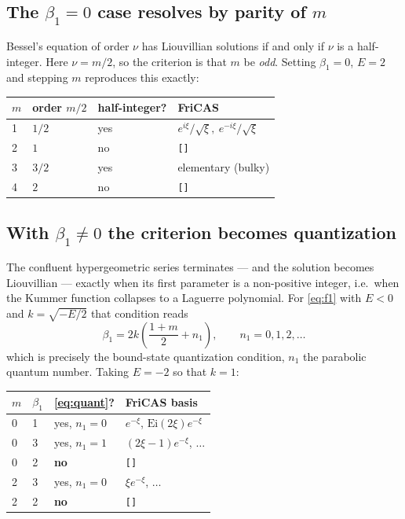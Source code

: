 \documentclass[11pt]{article}
\begin{document}
\subsection*{The $\beta_1=0$ case resolves by parity of $m$}

Bessel's equation of order $\nu$ has Liouvillian solutions if and only if
$\nu$ is a half-integer.  Here $\nu=m/2$, so the criterion is that $m$ be
\emph{odd}.  Setting $\beta_1=0$, $E=2$ and stepping $m$ reproduces this
exactly:

\begin{center}
\begin{tabular}{@{}llll@{}}
\toprule
$m$ & order $m/2$ & half-integer? & FriCAS \\
\midrule
1 & $1/2$ & yes & $e^{i\xi}/\sqrt\xi,\ e^{-i\xi}/\sqrt\xi$ \\
2 & $1$   & no  & \verb|[]| \\
3 & $3/2$ & yes & elementary (bulky) \\
4 & $2$   & no  & \verb|[]| \\
\bottomrule
\end{tabular}
\end{center}

\subsection*{With $\beta_1\neq0$ the criterion becomes quantization}

The confluent hypergeometric series terminates --- and the solution
becomes Liouvillian --- exactly when its first parameter is a non-positive
integer, i.e.\ when the Kummer function collapses to a Laguerre
polynomial.  For \eqref{eq:f1} with $E<0$ and $k=\sqrt{-E/2}$ that
condition reads
\begin{equation}\label{eq:quant}
\beta_1 = 2k\left(\frac{1+m}{2}+n_1\right), \qquad n_1=0,1,2,\dots
\end{equation}
which is precisely the bound-state quantization condition, $n_1$ the
parabolic quantum number.  Taking $E=-2$ so that $k=1$:

\begin{center}
\begin{tabular}{@{}lllp{}@{}}
\toprule
$m$ & $\beta_1$ & \eqref{eq:quant}? & FriCAS basis \\
\midrule
0 & 1 & yes, $n_1=0$ & $e^{-\xi}$,\; $\mathrm{Ei}(2\xi)e^{-\xi}$ \\
0 & 3 & yes, $n_1=1$ & $(2\xi-1)e^{-\xi}$,\; $\dots$ \\
0 & 2 & \textbf{no}  & \verb|[]| \\
2 & 3 & yes, $n_1=0$ & $\xi e^{-\xi}$,\; $\dots$ \\
2 & 2 & \textbf{no}  & \verb|[]| \\
\bottomrule
\end{tabular}
\end{center}
\end{document}
